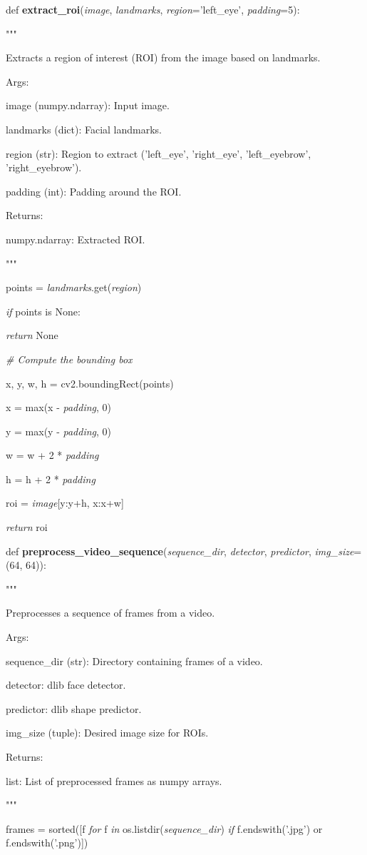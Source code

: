 \documentclass[
]{article}
\begin{document}
def \textbf{extract\_roi}(\emph{image}, \emph{landmarks}, \emph{region}='left\_eye', \emph{padding}=5):

"""

Extracts a region of interest (ROI) from the image based on landmarks.

Args:

image (numpy.ndarray): Input image.

landmarks (dict): Facial landmarks.

region (str): Region to extract ('left\_eye', 'right\_eye', 'left\_eyebrow', 'right\_eyebrow').

padding (int): Padding around the ROI.

Returns:

numpy.ndarray: Extracted ROI.

"""

points = \emph{landmarks}.get(\emph{region})

\emph{if} points is None:

\emph{return} None

\emph{\# Compute the bounding box}

x, y, w, h = cv2.boundingRect(points)

x = max(x - \emph{padding}, 0)

y = max(y - \emph{padding}, 0)

w = w + 2 * \emph{padding}

h = h + 2 * \emph{padding}

roi = \emph{image}{[}y:y+h, x:x+w{]}

\emph{return} roi

def \textbf{preprocess\_video\_sequence}(\emph{sequence\_dir}, \emph{detector}, \emph{predictor}, \emph{img\_size}=(64, 64)):

"""

Preprocesses a sequence of frames from a video.

Args:

sequence\_dir (str): Directory containing frames of a video.

detector: dlib face detector.

predictor: dlib shape predictor.

img\_size (tuple): Desired image size for ROIs.

Returns:

list: List of preprocessed frames as numpy arrays.

"""

frames = sorted({[}f \emph{for} f \emph{in} os.listdir(\emph{sequence\_dir}) \emph{if} f.endswith('.jpg') or f.endswith('.png'){]})
\end{document}
